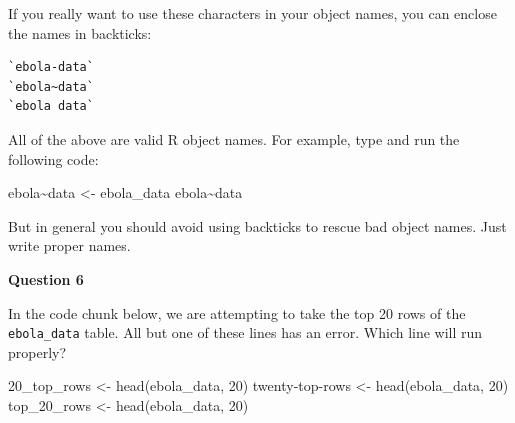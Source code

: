 \documentclass[
  letterpaper,
  DIV=11,
  numbers=noendperiod]{scrreprt}
\newenvironment{Shaded}{\begin{snugshade}}{\end{snugshade}}
\newcommand{\AttributeTok}[1]{\textcolor[rgb]{0.40,0.45,0.13}{#1}}
\newcommand{\DecValTok}[1]{\textcolor[rgb]{0.68,0.00,0.00}{#1}}
\newcommand{\FunctionTok}[1]{\textcolor[rgb]{0.28,0.35,0.67}{#1}}
\newcommand{\NormalTok}[1]{\textcolor[rgb]{0.00,0.23,0.31}{#1}}
\newcommand{\OtherTok}[1]{\textcolor[rgb]{0.00,0.23,0.31}{#1}}
\newcommand{\SpecialCharTok}[1]{\textcolor[rgb]{0.37,0.37,0.37}{#1}}
\newcommand{\StringTok}[1]{\textcolor[rgb]{0.13,0.47,0.30}{#1}}
\begin{document}
If you really want to use these characters in your object names, you can
enclose the names in backticks:

\begin{verbatim}
`ebola-data`
`ebola~data`
`ebola data`
\end{verbatim}

All of the above are valid R object names. For example, type and run the
following code:

\begin{Shaded}
\begin{Highlighting}[]
\StringTok{\textasciigrave{}}\AttributeTok{ebola\textasciitilde{}data}\StringTok{\textasciigrave{}} \OtherTok{\textless{}{-}}\NormalTok{ ebola\_data}
\StringTok{\textasciigrave{}}\AttributeTok{ebola\textasciitilde{}data}\StringTok{\textasciigrave{}}
\end{Highlighting}
\end{Shaded}

But in general you should avoid using backticks to rescue bad object
names. Just write proper names.

\begin{tcolorbox}[enhanced jigsaw, colframe=quarto-callout-tip-color-frame, rightrule=.15mm, opacityback=0, breakable, coltitle=black, colbacktitle=quarto-callout-tip-color!10!white, bottomrule=.15mm, leftrule=.75mm, toprule=.15mm, arc=.35mm, bottomtitle=1mm, colback=white, left=2mm, opacitybacktitle=0.6, titlerule=0mm, title=\textcolor{quarto-callout-tip-color}{\faLightbulb}\hspace{0.5em}{Practice}, toptitle=1mm]

\textbf{Question 6}

In the code chunk below, we are attempting to take the top 20 rows of
the \texttt{ebola\_data} table. All but one of these lines has an error.
Which line will run properly?

\begin{Shaded}
\begin{Highlighting}[]
\NormalTok{20\_top\_rows }\OtherTok{\textless{}{-}} \FunctionTok{head}\NormalTok{(ebola\_data, }\DecValTok{20}\NormalTok{)}
\NormalTok{twenty}\SpecialCharTok{{-}}\NormalTok{top}\SpecialCharTok{{-}}\NormalTok{rows }\OtherTok{\textless{}{-}} \FunctionTok{head}\NormalTok{(ebola\_data, }\DecValTok{20}\NormalTok{)}
\NormalTok{top\_20\_rows }\OtherTok{\textless{}{-}} \FunctionTok{head}\NormalTok{(ebola\_data, }\DecValTok{20}\NormalTok{)}
\end{Highlighting}
\end{Shaded}

\end{tcolorbox}
\end{document}
